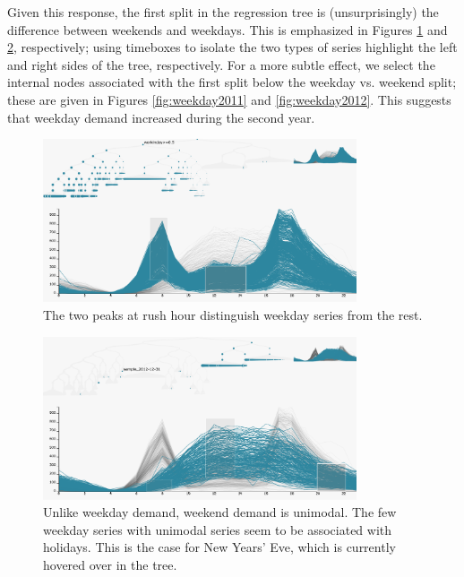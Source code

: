 \documentclass[12pt]{article}
\begin{document}
Given this response, the first split in the regression tree is
(unsurprisingly) the difference between weekends and weekdays. This is
emphasized in Figures \ref{fig:working} and \ref{fig:weekend}, respectively;
using timeboxes to isolate the two types of series highlight the left and right
sides of the tree, respectively. For a more subtle effect, we select the
internal nodes associated with the first split below the weekday vs. weekend
split; these are given in Figures \ref{fig:weekday2011} and
\ref{fig:weekday2012}. This suggests that weekday demand increased during the
second year.

\begin{figure}

{\centering \includegraphics[width=350px]{figure/working}

}

\caption{The two peaks at rush hour distinguish weekday series from the rest.}\label{fig:working}
\end{figure}

\begin{figure}

{\centering \includegraphics[width=350px]{figure/weekend}

}

\caption{Unlike weekday demand, weekend demand is unimodal. The few weekday series with unimodal series seem to be associated with holidays. This is the case for New Years' Eve, which is currently hovered over in the tree.}\label{fig:weekend}
\end{figure}
\end{document}
